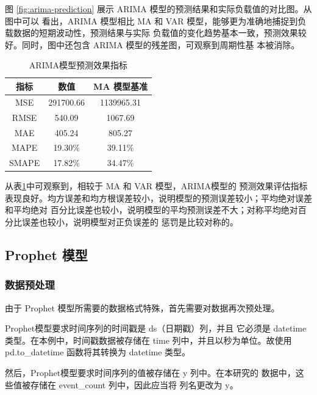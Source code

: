 \documentclass[a4paper,AutoFakeBold,oneside,12pt]{book}
\begin{document}
图 \ref{fig:arima-prediction} 展示 ARIMA 模型的预测结果和实际负载值的对比图。从图中可以
看出，ARIMA 模型相比 MA 和 VAR 模型，能够更为准确地捕捉到负载数据的短期波动性，预测结果与实际
负载值的变化趋势基本一致，预测效果较好。同时，图中还包含 ARIMA 模型的残差图，可观察到周期性基
本被消除。


\begin{table}[h]
    \centering
    \caption{ARIMA模型预测效果指标}
    \label{table:arima_evaluation_metrics}
    \begin{tabular}{c|c|c}
        \hline
        \textbf{指标} & \textbf{数值} & \textbf{MA 模型基准} \\
        \hline
        MSE & 291700.66 & 1139965.31 \\
        RMSE & 540.09 & 1067.69 \\
        MAE & 405.24 & 805.27 \\
        MAPE & 19.30\% & 39.11\% \\
        SMAPE & 17.82\% & 34.47\% \\
        \hline
    \end{tabular}
\end{table}
	
从表\ref{table:arima_evaluation_metrics}中可观察到，相较于 MA 和 VAR 模型，ARIMA模型的
预测效果评估指标表现良好。均方误差和均方根误差较小，说明模型的预测误差较小；平均绝对误差和平均绝对
百分比误差也较小，说明模型的平均预测误差不大；对称平均绝对百分比误差也较小，说明模型对正负误差的
惩罚是比较对称的。

\subsection{Prophet 模型}

\subsubsection{数据预处理}

由于 Prophet 模型所需要的数据格式特殊，首先需要对数据再次预处理。

Prophet模型要求时间序列的时间戳是 ds（日期戳）列，并且
它必须是 datetime 类型。在本例中，时间戳数据被存储在 
time 列中，并且以秒为单位。故使用 pd.to\_datetime 函数将其转换为 datetime 类型。

然后，Prophet模型要求时间序列的值被存储在 y 列中。在本研究的
数据中，这些值被存储在 event\_count 列中，因此应当将
列名更改为 y。
\end{document}
